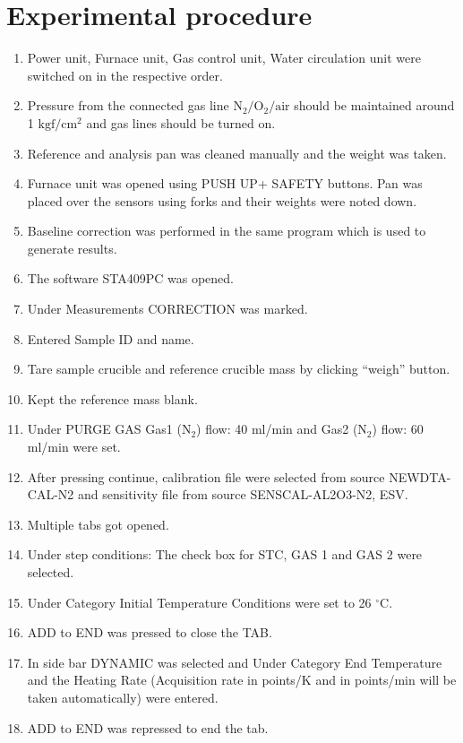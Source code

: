 \documentclass[11pt, a4paper]{article}
\begin{document}
\section{Experimental procedure}

\begin{enumerate}
	\item Power unit, Furnace unit, Gas control unit, Water circulation unit were   
	switched on in the respective order.
	\item Pressure from the connected gas line $\mathrm{N_2/O_2/air}$ should be 
	maintained around 1 $\mathrm{kgf/cm^2}$ and gas lines should be turned on.	      
	\item Reference and analysis pan was cleaned manually and the weight was taken.
	\item Furnace unit was opened using PUSH UP+ SAFETY buttons. Pan was placed
	over the sensors using forks and their weights were noted down.
	\item Baseline correction was performed in the same program which is used to
	generate results.
	\item The software STA409PC was opened.
	\item Under Measurements CORRECTION was marked.
	\item Entered Sample ID and name.
	\item Tare sample crucible and reference crucible mass by clicking “weigh” button.
	\item Kept the reference mass blank.
	\item Under PURGE GAS Gas1 ($\mathrm{N_2}$) flow: 40 ml/min and Gas2    
	($\mathrm{N_2}$) flow: 60 ml/min were set.
	\item After pressing continue, calibration file were selected from source  
	NEWDTA-CAL-N2 and sensitivity file from source SENSCAL-AL2O3-N2, ESV.
	\item Multiple tabs got opened.
	\item Under step conditions: The check box for STC, GAS 1 and GAS 2 were
	selected.
	\item Under Category Initial Temperature Conditions were set to 26 $^\circ$C.
	\item ADD to END was pressed to close the TAB.
	\item In side bar DYNAMIC was selected and Under Category End Temperature
	and the Heating Rate (Acquisition rate in points/K and in points/min will be
	taken automatically) were entered.
	\item ADD to END was repressed to end the tab.

\end{enumerate}
\end{document}
